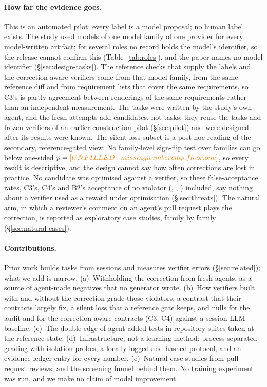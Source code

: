 \paragraph{How far the evidence goes.} This is an automated pilot: every label is a model proposal; no human label exists. The study used models of one model family of one provider for every model-written artifact; for several roles no record holds the model's identifier, so the release cannot confirm this (Table~\ref{tab:roles}), and the paper names no model identifier (\S\ref{sec:design-tasks}). The reference checks that supply the labels and the correction-aware verifiers come from that model family, from the same reference diff and from requirement lists that cover the same requirements, so C3's  is partly agreement between renderings of the same requirements rather than an independent measurement. The  tasks were written by the study's own agent, and the fresh attempts add candidates, not tasks: they reuse the tasks and frozen verifiers of an earlier construction pilot (\S\ref{sec:pilot}) and were designed after its results were known. The silent-loss subset is a post hoc reading of the secondary, reference-gated view. No family-level sign-flip test over  families can go below one-sided $p=\fv{cmp.floor.one}$, so every result is descriptive, and the design cannot say how often corrections are lost in practice. No candidate was optimised against a verifier, so these false-acceptance rates, C3's, C4's and B2's acceptance of no violator (, , ) included, say nothing about a verifier used as a reward under optimisation (\S\ref{sec:threats}). The natural arm, in which a reviewer's comment on an agent's pull request plays the correction, is reported as  exploratory case studies, family by family (\S\ref{sec:natural-cases}).

\paragraph{Contributions.} Prior work builds tasks from sessions and measures verifier errors (\S\ref{sec:related}); what we add is narrow. (a)~Withholding the correction from fresh agents, as a source of agent-made negatives that no generator wrote. (b)~How verifiers built with and without the correction grade those violators: a contrast that their contracts largely fix, a silent loss that a reference gate keeps, and nulls for the audit and for the correction-aware contracts (C3, C4) against a session-LLM baseline. (c)~The double edge of agent-added tests in repository suites taken at the reference state. (d)~Infrastructure, not a learning method: process-separated grading with isolation probes, a locally logged and hashed protocol, and an evidence-ledger entry for every number. (e)~Natural case studies from pull-request reviews, and the screening funnel behind them. No training experiment was run, and we make no claim of model improvement.
